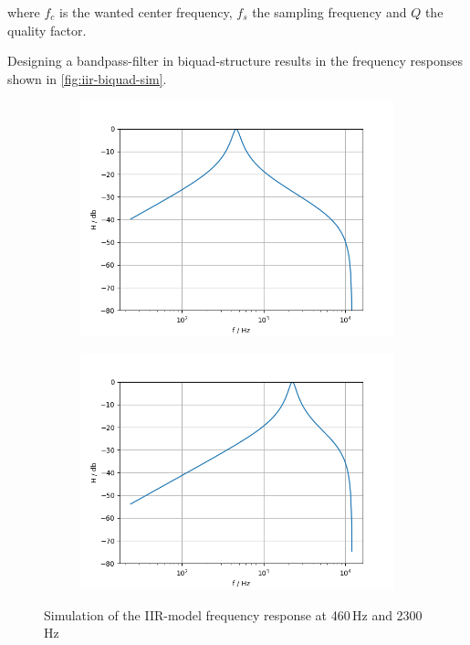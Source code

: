 where $f_c$ is the wanted center frequency, $f_s$ the sampling frequency and $Q$ the quality factor.

Designing a bandpass-filter in biquad-structure results in the frequency responses shown in \autoref{fig:iir-biquad-sim}.

\begin{figure}[!h]
    \centering
    \begin{subfigure}[c]{0.49\textwidth}
        \centering
        \includegraphics[width=\textwidth]{img/iir_bandpass460.png}
    \end{subfigure}
    \begin{subfigure}[c]{0.49\textwidth}
        \centering
        \includegraphics[width=\textwidth]{img/iir_bandpass2242.png}
    \end{subfigure}
    \caption{Simulation of the \ac{IIR}-model frequency response at 460\,Hz and 2300\,Hz}
    \label{fig:iir-biquad-sim}
\end{figure}

